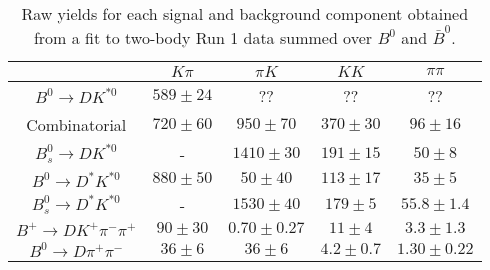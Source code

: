 \begin{table}
  \centering
  \begin{tabular}{ccccc}
      \toprule
       & $K\pi$ & $\pi K$ & $KK$ & $\pi\pi$ \\
      \midrule
      $B^0 \to DK^{*0}$ & $589 \pm 24$ & ?? & ?? & ?? \\
      Combinatorial & $720 \pm 60$ & $950 \pm 70$ & $370 \pm 30$ & $96 \pm 16$ \\
      $B^0_s \to DK^{*0}$ & \-- & $1410 \pm 30$ & $191 \pm 15$ & $50 \pm 8$ \\
      $B^0 \to D^*K^{*0}$ & $880 \pm 50$ & $50 \pm 40$ & $113 \pm 17$ & $35 \pm 5$ \\
      $B^0_s \to D^*K^{*0}$ & \-- & $1530 \pm 40$ & $179 \pm 5$ & $55.8 \pm 1.4$ \\
      $B^+ \to DK^+\pi^-\pi^+$ & $90 \pm 30$ & $0.70 \pm 0.27$ & $11 \pm 4$ & $3.3 \pm 1.3$ \\
      $B^0 \to D\pi^+\pi^-$ & $36 \pm 6$ & $36 \pm 6$ & $4.2 \pm 0.7$ & $1.30 \pm 0.22$ \\
      \bottomrule
      \end{tabular}
  \caption{Raw yields for each signal and background component obtained from a fit to two-body Run 1 data summed over $B^0$ and $\bar{B}^0$.}
\label{tab:yields_combined_2body_run1}
\end{table}

